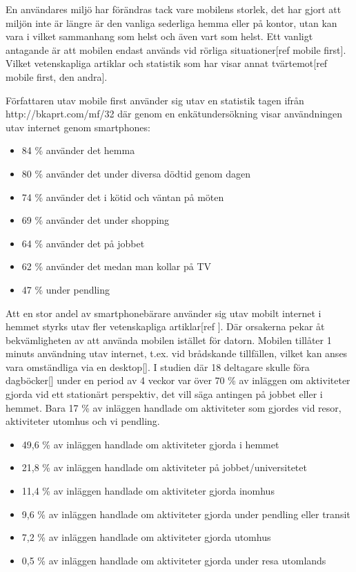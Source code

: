 \documentclass[11pt]{article}
\begin{document}
En användares miljö har förändras tack vare mobilens storlek, det har gjort att miljön inte är längre är den vanliga sederliga hemma eller på kontor, utan kan vara i vilket sammanhang som helst och även vart som helst. Ett vanligt antagande är att mobilen endast används vid rörliga situationer[ref mobile first]. Vilket vetenskapliga artiklar och statistik som har visar annat tvärtemot[ref mobile first, den andra].

Författaren utav mobile first använder sig utav en statistik tagen ifrån http://bkaprt.com/mf/32 där genom en enkätundersökning visar användningen utav internet genom smartphones:
\begin{itemize}
	\item{84 \% använder det hemma}
	\item{80 \% använder det under diversa dödtid genom dagen}
	\item{74 \% använder det i kötid och väntan på möten}
	\item{69 \% använder det under shopping}
	\item{64 \% använder det på jobbet}
	\item{62 \% använder det medan man kollar på TV}
	\item{47 \% under pendling}
\end{itemize}
\bigskip

Att en stor andel av smartphonebärare använder sig utav mobilt internet i hemmet styrks utav fler vetenskapliga artiklar[ref ]. Där orsakerna pekar åt bekvämligheten av att använda mobilen istället för datorn. Mobilen tillåter 1 minuts användning utav internet, t.ex. vid brådskande tillfällen, vilket kan anses vara omständliga via en desktop[]. I studien där 18 deltagare skulle föra dagböcker[] under en period av 4 veckor var över 70 \% av inläggen om aktiviteter gjorda vid ett stationärt perspektiv, det vill säga antingen på jobbet eller i hemmet. Bara 17 \% av inläggen handlade om aktiviteter som gjordes vid resor, aktiviteter utomhus och vi pendling.
\\
\begin{itemize}
	\item{49,6 \% av inläggen handlade om aktiviteter gjorda i hemmet}
	\item{21,8 \% av inläggen handlade om aktiviteter på jobbet/universitetet}
	\item{11,4 \% av inläggen handlade om aktiviteter gjorda inomhus}
	\item{9,6 \% av inläggen handlade om aktiviteter gjorda under pendling eller transit}
	\item{7,2 \% av inläggen handlade om aktiviteter gjorda utomhus}
	\item{0,5 \% av inläggen handlade om aktiviteter gjorda under resa utomlands}
\end{itemize}
\bigskip
\end{document}
